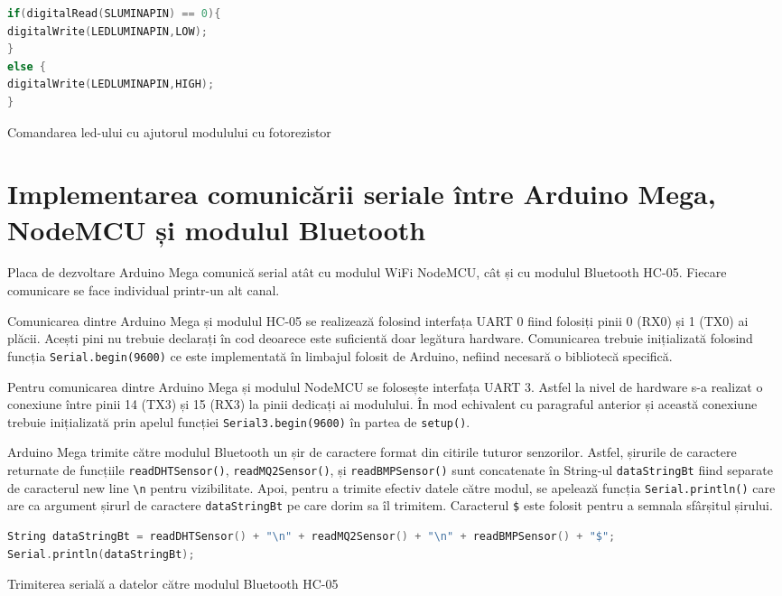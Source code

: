 \begin{code}[H]
\begin{lstlisting}[language=C++]
if(digitalRead(SLUMINAPIN) == 0){
digitalWrite(LEDLUMINAPIN,LOW);
}
else {
digitalWrite(LEDLUMINAPIN,HIGH);
}
\end{lstlisting}
\caption{Comandarea led-ului cu ajutorul modulului cu fotorezistor}
\label{code:func_lum_led}
\end{code}

\section{Implementarea comunicării seriale între Arduino Mega, NodeMCU și modulul Bluetooth}

Placa de dezvoltare Arduino Mega comunică serial atât cu modulul WiFi NodeMCU, cât și cu modulul Bluetooth HC-05. Fiecare comunicare se face individual printr-un alt canal.

Comunicarea dintre Arduino Mega și modulul HC-05 se realizează folosind interfața UART 0 fiind folosiți pinii 0 (RX0) și 1 (TX0) ai plăcii. Acești pini nu trebuie declarați în cod deoarece este suficientă doar legătura hardware. Comunicarea trebuie inițializată folosind funcția \texttt{Serial.begin(9600)} ce este implementată în limbajul folosit de Arduino, nefiind necesară o bibliotecă specifică.

Pentru comunicarea dintre Arduino Mega și modulul NodeMCU se folosește interfața UART 3. Astfel la nivel de hardware s-a realizat o conexiune între pinii 14 (TX3) și 15 (RX3) la pinii dedicați ai modulului. În mod echivalent cu paragraful anterior și această conexiune trebuie inițializată prin apelul funcției \texttt{Serial3.begin(9600)} în partea de \texttt{setup()}.

Arduino Mega trimite către modulul Bluetooth un șir de caractere format din citirile tuturor senzorilor. Astfel, șirurile de caractere returnate de funcțiile \texttt{readDHTSensor()}, \texttt{readMQ2Sensor()}, și \texttt{readBMPSensor()} sunt concatenate în String-ul \texttt{dataStringBt} fiind separate de caracterul new line \texttt{\textbackslash n} pentru vizibilitate. Apoi, pentru a trimite efectiv datele către modul, se apelează funcția \texttt{Serial.println()} care are ca argument șirurl de caractere \texttt{dataStringBt} pe care dorim sa îl trimitem. Caracterul \texttt{\$} este folosit pentru a semnala sfârșitul șirului.

\begin{code}[H]
\begin{lstlisting}[language=C++]
String dataStringBt = readDHTSensor() + "\n" + readMQ2Sensor() + "\n" + readBMPSensor() + "$";
Serial.println(dataStringBt);
\end{lstlisting}
\caption{Trimiterea serială a datelor către modulul Bluetooth HC-05}
\label{code:func_uart_bt}
\end{code}

